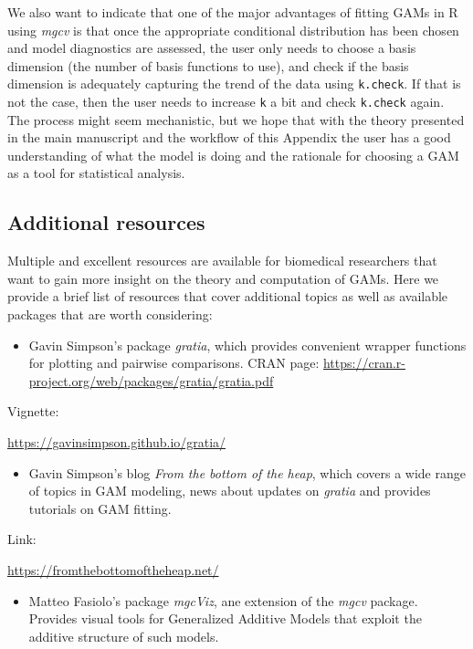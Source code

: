 \documentclass[
]{article}
\newcommand{\passthrough}[1]{#1}
\providecommand{\tightlist}{%
  \setlength{\itemsep}{0pt}\setlength{\parskip}{0pt}}
\begin{document}
We also want to indicate that one of the major advantages of fitting GAMs in R using \emph{mgcv} is that once the appropriate conditional distribution has been chosen and model diagnostics are assessed, the user only needs to choose a basis dimension (the number of basis functions to use), and check if the basis dimension is adequately capturing the trend of the data using \passthrough{\lstinline!k.check!}. If that is not the case, then the user needs to increase \passthrough{\lstinline!k!} a bit and check \passthrough{\lstinline!k.check!} again. The process might seem mechanistic, but we hope that with the theory presented in the main manuscript and the workflow of this Appendix the user has a good understanding of what the model is doing and the rationale for choosing a GAM as a tool for statistical analysis.

\hypertarget{additional-resources}{%
\subsection{Additional resources}\label{additional-resources}}

Multiple and excellent resources are available for biomedical researchers that want to gain more insight on the theory and computation of GAMs. Here we provide a brief list of resources that cover additional topics as well as available packages that are worth considering:

\begin{itemize}
\tightlist
\item
  Gavin Simpson's package \emph{gratia}, which provides convenient wrapper functions for plotting and pairwise comparisons.
  CRAN page:
  \url{https://cran.r-project.org/web/packages/gratia/gratia.pdf}
\end{itemize}

Vignette:

\url{https://gavinsimpson.github.io/gratia/}

\begin{itemize}
\tightlist
\item
  Gavin Simpson's blog \emph{From the bottom of the heap}, which covers a wide range of topics in GAM modeling, news about updates on \emph{gratia} and provides tutorials on GAM fitting.
\end{itemize}

Link:

\url{https://fromthebottomoftheheap.net/}

\begin{itemize}
\tightlist
\item
  Matteo Fasiolo's package \emph{mgcViz}, ane extension of the \emph{mgcv} package. Provides visual tools for Generalized Additive Models that exploit the additive structure of such models.
\end{itemize}
\end{document}
